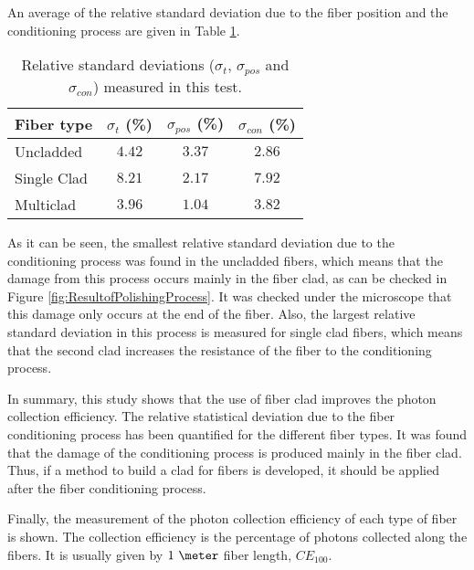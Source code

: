 
An average of the relative standard deviation due to the fiber position and the conditioning process are given in Table \ref{tab:RelativeStandardDeviations}.

\begin{table}[htbp]
\centering{}%
\begin{tabular}{lccc}
\toprule 
Fiber type & $\sigma_t$ (\%) & $\sigma_{pos}$ (\%) & $\sigma_{con}$ (\%) \tabularnewline
\midrule
\midrule 
Uncladded & $4.42$ & $3.37$ & $2.86$ \tabularnewline
Single Clad & $8.21$ & $2.17$ & $7.92$ \tabularnewline
Multiclad & $3.96$ & $1.04$ & $3.82$ \tabularnewline
\bottomrule
\end{tabular}
\caption{Relative standard deviations ($\sigma_t$, $\sigma_{pos}$ and $\sigma_{con}$) measured in this test.}
\label{tab:RelativeStandardDeviations}
\end{table}

As it can be seen, the smallest relative standard deviation due to the conditioning process was found in the uncladded fibers, which means that the damage from this process occurs mainly in the fiber clad, as can be checked in Figure \ref{fig:ResultofPolishingProcess}. It was checked under the microscope that this damage only occurs at the end of the fiber. Also, the largest relative standard deviation in this process is measured for single clad fibers, which means that the second clad increases the resistance of the fiber to the conditioning process.

In summary, this study shows that the use of fiber clad improves the photon collection efficiency. The relative statistical deviation due to the fiber conditioning process has been quantified for the different fiber types. It was found that the damage of the conditioning process is produced mainly in the fiber clad. Thus, if a method to build a clad for fibers is developed, it should be applied after the fiber conditioning process.

Finally, the measurement of the photon collection efficiency of each type of fiber is shown. The collection efficiency is the percentage of photons collected along the fibers. It is usually given by $1~\meter$ fiber length, $CE_ {100}$.

